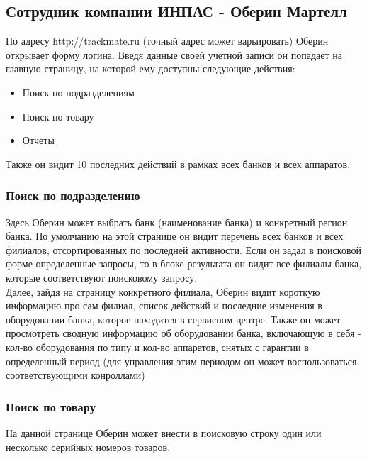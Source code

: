 \documentclass[DIV=calc, paper=a4, fontsize=11pt]{scrartcl} %
\begin{document}
\begin{framed}
\subsection{Сотрудник компании ИНПАС - Оберин Мартелл}
По адресу http://trackmate.ru (точный адрес может варьировать) Оберин открывает форму логина. Введя данные своей учетной записи он попадает на главную страницу, на которой ему доступны следующие действия:
\begin{itemize}
	\item Поиск по подразделениям
	\item Поиск по товару
	\item Отчеты
\end{itemize} 	
Также он видит 10 последних действий в рамках всех банков и всех аппаратов.

\subsubsection{Поиск по подразделению}
Здесь Оберин может выбрать банк (наименование банка) и конкретный регион банка. По умолчанию на этой странице он видит перечень всех банков и всех филиалов, отсортированных по последней активности. Если он задал в поисковой форме определенные запросы, то в блоке результата он видит все филиалы банка, которые соответствуют поисковому запросу.
\\[0.5cm]
Далее, зайдя на страницу конкретного филиала, Оберин видит короткую информацию про сам филиал, список действий и последние изменения в оборудовании банка, которое находится в сервисном центре.
Также он может просмотреть сводную информацию об оборудовании банка, включающую в себя - кол-во оборудования по типу и кол-во аппаратов, снятых с гарантии в определенный период (для управления этим периодом он может воспользоваться соответствующими конроллами)

\subsubsection{Поиск по товару}
На данной странице Оберин может внести в поисковую строку один или несколько серийных номеров товаров.
\end{framed}
\end{document}
